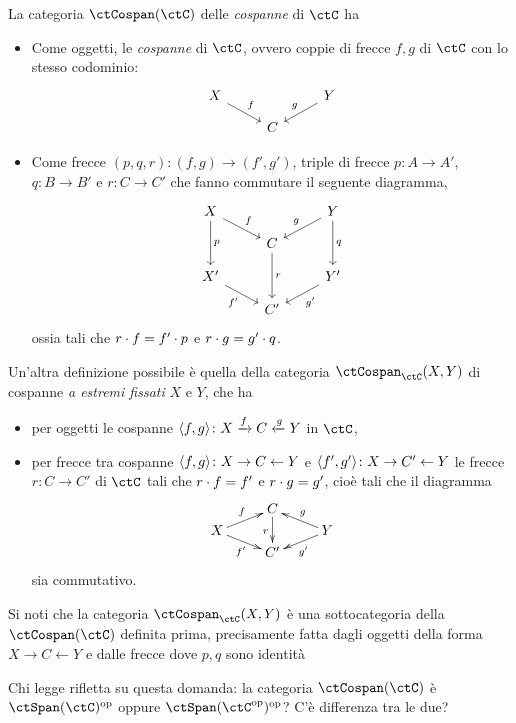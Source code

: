\begin{definition}
 La categoria \(\ctCospan(\ctC)\) delle \emph{cospanne} di \(\ctC\) ha
 \begin{itemize}
  \item Come oggetti, le \emph{cospanne} di \(\ctC\), ovvero coppie di frecce \(f,g\) di \(\ctC\) con lo stesso codominio:
        \[
         \begin{tikzcd}[row sep=small]
          X \ar{dr}{f} && Y \ar{dl}[swap]{g} \\
          & C
         \end{tikzcd}
        \]
  \item Come frecce \((p,q,r)\colon(f,g)\to (f',g')\), triple di frecce \(p\colon A\to A'\), \(q\colon B\to B'\) e \(r\colon C\to C'\) che fanno commutare il seguente diagramma,
        \[
         \begin{tikzcd}[row sep=small]
          X \ar{dd}{p} \ar{dr}{f} && Y \ar{dd}{q} \ar{dl}[swap]{g} \\
          & C \ar{dd}{r} \\
          X' \ar{dr}[swap]{f'} && Y' \ar{dl}{g'} \\
          & C'
         \end{tikzcd}
        \]
        ossia tali che \(r\cdot f=f'\cdot p\) e \(r\cdot g=g'\cdot q\).
 \end{itemize}
 Un'altra definizione possibile è quella della categoria \(\Hom{\ctCospan_\ctC}(X,Y)\) di cospanne \emph{a estremi fissati} \(X\) e \(Y\), che ha
 \begin{itemize}
  \item per oggetti le cospanne	\(\langle f,g\rangle \colon X\xrightarrow{f} C\xleftarrow{g} Y\) in \(\ctC\),
  \item per frecce tra cospanne	\(\langle f,g\rangle \colon X\to C\leftarrow Y\) e \(\langle f',g'\rangle \colon X\to C'\leftarrow Y\) le frecce \(r \colon C\to C'\) di \(\ctC\) tali che \(r\cdot f = f'\) e \(r\cdot g=g'\), cioè tali che il diagramma
        \[\xymatrix@R=1mm{
         &C\ar[dd]_r & \\
         X \ar[dr]_{f'}\ar[ur]^f&& Y\ar[ul]_g\ar[dl]^{g'}\\
         & C'
         }\]
        sia commutativo.
 \end{itemize}
 Si noti che la categoria \(\Hom{\ctCospan_\ctC}(X,Y)\) è una sottocategoria della \(\ctCospan(\ctC)\) definita prima, precisamente fatta dagli oggetti della forma \(X\to C\leftarrow Y\) e dalle frecce dove \(p,q\) sono identità
\end{definition}
Chi legge rifletta su questa domanda: la categoria \(\ctCospan(\ctC)\) è \(\ctSpan(\ctC)^\op\) oppure \(\ctSpan(\ctC^\op)^\op\)? C'è differenza tra le due?

